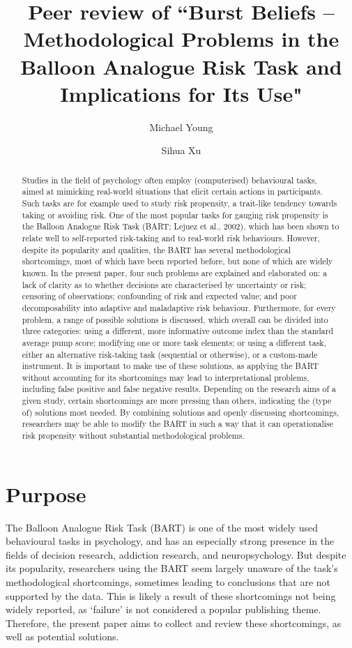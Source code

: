 \documentclass[serif, twocolumn, review]{jote-article}
\title{Peer review of ``Burst Beliefs – Methodological Problems in the Balloon Analogue Risk Task and Implications for Its Use"}
\author[1]{Michael Young}
\author[2]{Sihua Xu}
\affil[1]{Reviewer 1}
\affil[2]{Reviewer 2}
\begin{document}
\begin{frontmatter}
\maketitle 
\begin{abstract}
Studies in the field of psychology often employ (computerised) behavioural tasks, aimed at mimicking real-world situations that elicit certain actions in participants. Such tasks are for example used to study risk propensity, a trait-like tendency towards taking or avoiding risk. One of the most popular tasks for gauging risk propensity is the Balloon Analogue Risk Task (BART; Lejuez et al., 2002), which has been shown to relate well to self-reported risk-taking and to real-world risk behaviours. However, despite its popularity and qualities, the BART has several methodological shortcomings, most of which have been reported before, but none of which are widely known. In the present paper, four such problems are explained and elaborated on: a lack of clarity as to whether decisions are characterised by uncertainty or risk; censoring of observations; confounding of risk and expected value; and poor decomposability into adaptive and maladaptive risk behaviour. Furthermore, for every problem, a range of possible solutions is discussed, which overall can be divided into three categories: using a different, more informative outcome index than the standard average pump score; modifying one or more task elements; or using a different task, either an alternative risk-taking task (sequential or otherwise), or a custom-made instrument. It is important to make use of these solutions, as applying the BART without accounting for its shortcomings may lead to interpretational problems, including false positive and false negative results. Depending on the research aims of a given study, certain shortcomings are more pressing than others, indicating the (type of) solutions most needed. By combining solutions and openly discussing shortcomings, researchers may be able to modify the BART in such a way that it can operationalise risk propensity without substantial methodological problems.

\end{abstract}
\end{frontmatter}


{}
\section*{Purpose}
The Balloon Analogue Risk Task (BART) is one of the most widely used behavioural tasks in psychology, and has an especially strong presence in the fields of decision research, addiction research, and neuropsychology. But despite its popularity, researchers using the BART seem largely unaware of the task's methodological shortcomings, sometimes leading to conclusions that are not supported by the data. This is likely a result of these shortcomings not being widely reported, as `failure' is not considered a popular publishing theme. Therefore, the present paper aims to collect and review these shortcomings, as well as potential solutions. 
\end{document}
